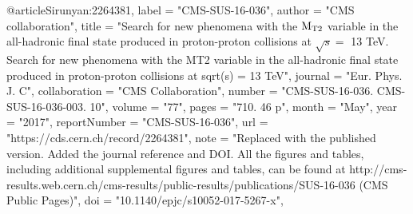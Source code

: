 @article{Sirunyan:2264381,
      label          = "CMS-SUS-16-036",
      author        = "{CMS collaboration}",
      title         = "{Search for new phenomena with the $ \mathrm{ M_{\rm T2} }
                       $ variable in the all-hadronic final state produced in
                       proton-proton collisions at $\sqrt{s} = $ 13 TeV. Search
                       for new phenomena with the MT2 variable in the all-hadronic
                       final state produced in proton-proton collisions at sqrt(s)
                       = 13 TeV}",
      journal       = "Eur. Phys. J. C",
      collaboration = "CMS Collaboration",
      number        = "CMS-SUS-16-036. CMS-SUS-16-036-003. 10",
      volume        = "77",
      pages         = "710. 46 p",
      month         = "May",
      year          = "2017",
      reportNumber  = "CMS-SUS-16-036",
      url           = "https://cds.cern.ch/record/2264381",
      note          = "Replaced with the published version. Added the journal
                       reference and DOI. All the figures and tables, including
                       additional supplemental figures and tables, can be found at
                       http://cms-results.web.cern.ch/cms-results/public-results/publications/SUS-16-036
                       (CMS Public Pages)",
      doi           = "10.1140/epjc/s10052-017-5267-x",
}

